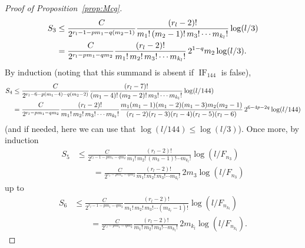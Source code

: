 \documentclass[11pt, a4paper]{article}
\newcommand{\manF}{\Lambda_{\mathcal{F}}}
\newcommand{\IF}{\operatorname{IF}}
\theoremstyle{plain}
\theoremstyle{definition}
\begin{document}
\begin{proof}[Proof of Proposition~\ref{prop:Mcg}]
\begin{align}
\notag
S_3 
&\le \frac{C}{2^{r_l-1-pm_1-q(m_2-1)}} \frac{(r_l-2)!}{m_1!\,(m_2-1)!\,m_3! \cdots m_{k_l}!} \log(l/3) \\
&= \frac{C}{2^{r_l-pm_1-qm_2}} \frac{(r_l-2)!}{m_1!\,m_2!\,m_3! \cdots m_{k_l}!} 
\, 2^{1-q} m_2 \log(l/3).
\label{eq:men6-3}
\end{align}
By induction (noting that this summand is absent if $\IF_{144}$ is false), 
\begin{align}
\notag
S_4 
&\le \frac{C}{2^{r_l-6-p(m_1-4)-q(m_2-2)}} \frac{(r_l-7)!}{(m_1-4)!\,(m_2-2)!\,m_3! \cdots m_{k_l}!} \log(l/144) \\
&= \frac{C}{2^{r_l-pm_1-qm_2}} \frac{(r_l-2)!}{m_1!\,m_2!\,m_3! \cdots m_{k_l}!} 
\frac{m_1(m_1-1)(m_1-2)(m_1-3)m_2(m_2-1)}{(r_l-2)(r_l-3)(r_l-4)(r_l-5)(r_l-6)} \, 2^{6-4p-2q} \log(l/144)
\label{eq:men6-4}
\end{align}
(and if needed, here we can use that $\log(l/144) \le \log(l/3)$).
Once more, by induction
\begin{align*}
S_5 
&\le \frac{C}{2^{r_l-1-pm_1-qm_2}} \frac{(r_l-2)!}{m_1!\,m_2!\,(m_3-1)! \cdots m_{k_l}!} \log(l/F_{n_3}) \\
&\qquad= \frac{C}{2^{r_l-pm_1-qm_2}} \frac{(r_l-2)!}{m_1!\,m_2!\,m_3! \cdots m_{k_l}!} \, 2m_3 \log(l/F_{n_3})
\end{align*}
up to
\begin{align*}
S_6 
&\le \frac{C}{2^{r_l-1-pm_1-qm_2}} \frac{(r_l-2)!}{m_1!\,m_2!\,m_3! \cdots (m_{k_l}-1)!} \log(l/F_{n_{k_l}}) \\
&\qquad= \frac{C}{2^{r_l-pm_1-qm_2}} \frac{(r_l-2)!}{m_1!\,m_2!\,m_3! \cdots m_{k_l}!} 
\, 2m_{k_l} \log(l/F_{n_{k_l}}).
\end{align*}


\end{proof}
\end{document}
